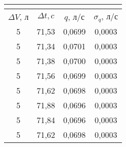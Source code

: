 \documentclass[a4paper,12pt]{article}
\begin{document}
\begin{enumerate}
\begin{center}
                \\ \phantom{Ящеры} \\
			\begin{tabular}{|c|c|c|c|}
				\hline
				\multicolumn{4}{|c|}{\text{Измерение расхода $q_3$}} \\
				\hline
				$\Delta V$, л & $\Delta t, c$ & $q$, л/с  & $\sigma_q$, л/с \\ \hline
				5             & 71,53         & 0,0699    & 0,0003          \\ \hline
				5             & 71,34         & 0,0701    & 0,0003	 	    \\\hline
				5             & 71,38         & 0,0700    & 0,0003          \\ \hline
				5             & 71,56         & 0,0699    & 0,0003          \\ \hline
				5             & 71,62         & 0,0698    & 0,0003          \\ \hline
				5             & 71,88         & 0,0696    & 0,0003          \\ \hline
				5             & 71,84         & 0,0696    & 0,0003          \\ \hline
				5             & 71,62         & 0,0698    & 0,0003          \\ \hline
			\end{tabular}
		\end{center}
	\end{enumerate}
\end{document}

